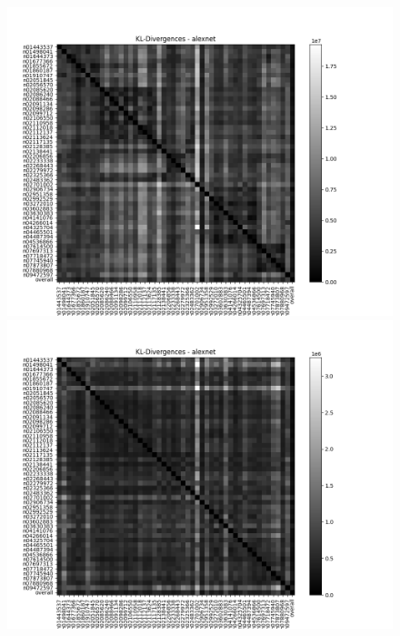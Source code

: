 \documentclass{article}
\begin{document}
\begin{figure}[H]
\begin{minipage}{0.45\textwidth}
        \end{minipage}\hfill
        \begin{minipage}{0.45\textwidth}
            \centering
            \includegraphics[width=\textwidth]{images/alexnet_kl_matrix_imgr.png} %
        \end{minipage}
        \begin{minipage}{0.45\textwidth}
            \centering
            \includegraphics[width=\textwidth]{images/alexnet_kl_matrix_untrained_imgr_2.png} %
            

\end{minipage}
\end{figure}
\end{document}
